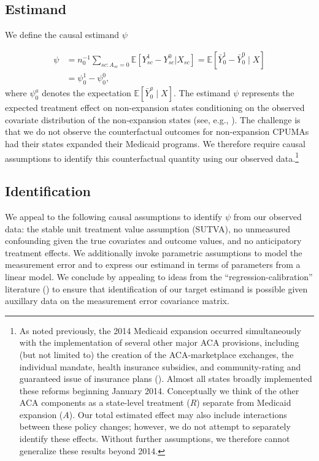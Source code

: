 \documentclass[aoas]{imsart}
\theoremstyle{plain}
\theoremstyle{remark}
\begin{document}
\subsection{Estimand} \label{ssec:estimand}

We define the causal estimand $\psi$

\begin{align} \label{eqn:psi}
    \psi &= n_0^{-1} \sum_{sc: A_{sc}=0} \mathbb{E}\left[ Y_{sc}^1 - Y_{sc}^0 | X_{sc}\right] = \mathbb{E}[\bar{Y}_0^1 - \bar{Y}_0^0 \mid X] \\ 
    &= \psi_0^1 - \psi_0^0,
\end{align}
where $\psi_0^a$ denotes the expectation $\mathbb{E}[\bar{Y}_0^a \mid X]$. The estimand $\psi$ represents the expected treatment effect on non-expansion states conditioning on the observed covariate distribution of the non-expansion states (see, e.g., \cite{imbens2004nonparametric}). The challenge is that we do not observe the counterfactual outcomes for non-expansion CPUMAs had their states expanded their Medicaid programs. We therefore require causal assumptions to identify this counterfactual quantity using our observed data.\footnote{As noted previously, the 2014 Medicaid expansion occurred simultaneously with the implementation of several other major ACA provisions, including (but not limited to) the creation of the ACA-marketplace exchanges, the individual mandate, health insurance subsidies, and community-rating and guaranteed issue of insurance plans (\cite{courtemanche2017early}). Almost all states broadly implemented these reforms beginning January 2014. Conceptually we think of the other ACA components as a state-level treatment ($R$) separate from Medicaid expansion ($A$). Our total estimated effect may also include interactions between these policy changes; however, we do not attempt to separately identify these effects. Without further assumptions, we therefore cannot generalize these results beyond 2014.} 

\subsection{Identification} \label{ssec:identification}

We appeal to the following causal assumptions to identify $\psi$ from our observed data: the stable unit treatment value assumption (SUTVA), no unmeasured confounding given the true covariates and outcome values, and no anticipatory treatment effects. We additionally invoke parametric assumptions to model the measurement error and to express our estimand in terms of parameters from a linear model. We conclude by appealing to ideas from the ``regression-calibration'' literature (\cite{gleser1992importance}) to ensure that identification of our target estimand is possible given auxillary data on the measurement error covariance matrix.
\end{document}
